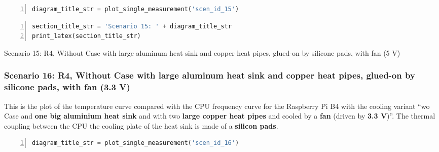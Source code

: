 \documentclass[10pt,parskip=half,
toc=sectionentrywithdots,
bibliography=totocnumbered,
captions=tableheading,numbers=noendperiod]{scrartcl}
\begin{document}
\begin{lstlisting}[language=Python,numbers=left,xleftmargin=20pt,xrightmargin=5pt,belowskip=5pt,aboveskip=5pt]
diagram_title_str = plot_single_measurement('scen_id_15')
\end{lstlisting}

\begin{figure}[H]\begin{center}\end{center}\end{figure}

\begin{lstlisting}[language=Python,numbers=left,xleftmargin=20pt,xrightmargin=5pt,belowskip=5pt,aboveskip=5pt]
section_title_str = 'Scenario 15: ' + diagram_title_str
print_latex(section_title_str)
\end{lstlisting}

\begin{table}[H]
\centering
\begin{adjustbox}{max width=\textwidth}
Scenario 15: R4, Without Case with large aluminum heat sink and copper heat pipes, glued-on by silicone pads, with fan (5 V)
\end{adjustbox}
\end{table}

\hypertarget{scenario-16-r4-without-case-with-large-aluminum-heat-sink-and-copper-heat-pipes-glued-on-by-silicone-pads-with-fan-3.3-v}{%
\subsubsection{Scenario 16: R4, Without Case with large aluminum heat
sink and copper heat pipes, glued-on by silicone pads, with fan (3.3
V)}\label{scenario-16-r4-without-case-with-large-aluminum-heat-sink-and-copper-heat-pipes-glued-on-by-silicone-pads-with-fan-3.3-v}}

This is the plot of the temperature curve compared with the CPU
frequency curve for the Raspberry Pi B4 with the cooling variant ``wo
Case and \textbf{one big aluminium heat sink} and with two \textbf{large
copper heat pipes} and cooled by a \textbf{fan} (driven by \textbf{3.3
V})''. The thermal coupling between the CPU the cooling plate of the
heat sink is made of a \textbf{silicon pads}.

\begin{lstlisting}[language=Python,numbers=left,xleftmargin=20pt,xrightmargin=5pt,belowskip=5pt,aboveskip=5pt]
diagram_title_str = plot_single_measurement('scen_id_16')
\end{lstlisting}
\end{document}
